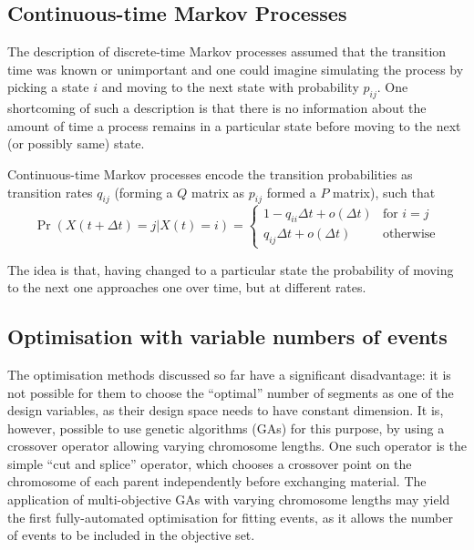 \subsection{Continuous-time Markov Processes}
The description of discrete-time Markov processes assumed that the
transition time was known or unimportant and one could imagine
simulating the process by picking a state $i$ and moving to the next
state with probability $p_{ij}$.  One shortcoming of such a
description is that there is no information about the amount of time a
process remains in a particular state before moving to the next (or
possibly same) state.  

Continuous-time Markov processes encode the transition probabilities as
transition rates $q_{ij}$ (forming a $Q$ matrix as $p_{ij}$ formed a
$P$ matrix), such that
\begin{equation}
  \label{eq:contmarkov}
  \Pr(X(t+\Delta t) = j | X(t) = i) = 
  \begin{cases}
    1 - q_{ii}\Delta t + o(\Delta t) & \text{for } i = j \\
    q_{ij}\Delta t + o(\Delta t) & \text{otherwise}
  \end{cases}
\end{equation}

The idea is that, having changed to a particular state the probability of moving to the next one approaches one over time, but at different rates.


\subsection{Optimisation with variable numbers of events}
The optimisation methods discussed so far have a significant
disadvantage: it is not possible for them to choose the ``optimal''
number of segments as one of the design variables, as their design space
needs to have constant dimension. It is, however, possible to use
genetic algorithms (GAs) for this purpose, by using a crossover
operator allowing varying chromosome lengths.  One such operator is
the simple ``cut and splice'' operator, which chooses a crossover
point on the chromosome of each parent independently before exchanging
material.  The application of multi-objective GAs with varying
chromosome lengths may yield the first fully-automated optimisation
for fitting events, as it allows the number of events to be included
in the objective set.

